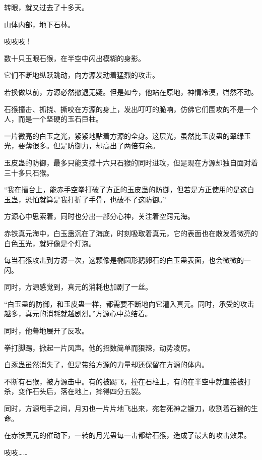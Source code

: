 
\begin{this_body}



转眼，就又过去了十多天。

山体内部，地下石林。

吱吱吱！

数十只玉眼石猴，在半空中闪出模糊的身影。

它们不断地纵跃跳动，向方源发动着猛烈的攻击。

若换做以前，方源必然撤退无疑。但是如今，他站在原地，神情冷漠，岿然不动。

石猴撞击、抓挠、撕咬在方源的身上，发出叮叮的脆响，仿佛它们围攻的不是一个人，而是一个坚硬的玉石巨柱。

一片微亮的白玉之光，紧紧地贴着方源的全身。这层光，虽然比玉皮蛊的翠绿玉光，要薄很多。但是防御力，却高出了两倍有余。

玉皮蛊的防御，最多只能支撑十六只石猴的同时进攻，但是现在方源却独自面对着三十多只石猴。

“我在擂台上，能赤手空拳打破了方正的玉皮蛊的防御，但若是方正使用的是这白玉蛊，恐怕就算是我打折了手骨，也破不了这防御。”

方源心中思索着，同时也分出一部分心神，关注着空窍元海。

赤铁真元海中，白玉蛊沉在了海底，时刻吸取着真元，它的表面也在散发着微亮的白色玉光，就好像是个灯泡。

每当石猴攻击到方源一次，这颗像是椭圆形鹅卵石的白玉蛊表面，也会微微的一闪。

同时，方源感觉到，真元的消耗也加剧了一丝。

“白玉蛊的防御，和玉皮蛊一样，都需要不断地向它灌入真元。同时，承受的攻击越多，真元的消耗就越剧烈。”方源心中总结着。

同时，他蓦地展开了反攻。

拳打脚踢，掀起一片风声。他的招数简单而狠辣，动势凌厉。

白豕蛊虽然消失了，但是带给方源的力量却还保留在方源的体内。

不断有石猴，被方源击中。有的被踢飞，撞在石柱上，有的在半空中就直接被打杀，变作石头后，落在地上，摔得四分五裂。

同时，方源甩手之间，月刃也一片片地飞出来，宛若死神之镰刀，收割着石猴的生命。

在赤铁真元的催动下，一转的月光蛊每一击都给石猴，造成了最大的攻击效果。

吱吱……


\end{this_body}
